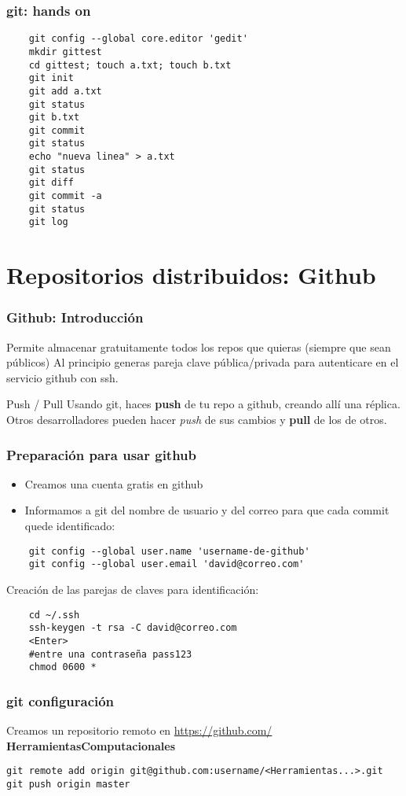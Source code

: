 \documentclass{beamer}
\begin{document}
\begin{frame}[fragile]
	\frametitle{git: hands on}
	\begin{verbatim}
	git config --global core.editor 'gedit'
	mkdir gittest 
	cd gittest; touch a.txt; touch b.txt
	git init
	git add a.txt
	git status
	git b.txt
	git commit
	git status
	echo "nueva linea" > a.txt
	git status
	git diff
	git commit -a
	git status
	git log
	\end{verbatim}

\end{frame}

\section{Repositorios distribuidos: Github}

\begin{frame}
	\frametitle{Github: Introducción}
	Permite almacenar gratuitamente todos los repos que quieras (siempre que sean públicos)
	Al principio generas pareja clave pública/privada para autenticare en el servicio github con ssh.
	
\begin{block}{Push / Pull}
	Usando git, haces \textbf{push} de tu repo a github, creando allí una réplica. Otros desarrolladores pueden hacer \textit{push} de sus cambios y \textbf{pull} de los de otros.
\end{block}

\end{frame}

\begin{frame}[fragile]
	\frametitle{Preparación para usar github}
	\begin{itemize}
		\item Creamos una cuenta gratis en github
		\item Informamos a git del nombre de usuario y del correo para que cada commit quede identificado:
	\end{itemize}
	\begin{verbatim}
	git config --global user.name 'username-de-github'
	git config --global user.email 'david@correo.com'
	\end{verbatim}
	Creación de las parejas de claves para identificación:
	\begin{verbatim}
	cd ~/.ssh
	ssh-keygen -t rsa -C david@correo.com
	<Enter>
	#entre una contraseña pass123
	chmod 0600 *
	\end{verbatim}
\end{frame}

\begin{frame}[fragile,shrink=20]
	\frametitle{git configuración}
	Creamos un repositorio remoto en \href{https://github.com/new}{https://github.com/}
	\textbf{HerramientasComputacionales}
	
\begin{verbatim}
git remote add origin git@github.com:username/<Herramientas...>.git
git push origin master
\end{verbatim}
	
	
	
\end{frame}


	
\end{document}
